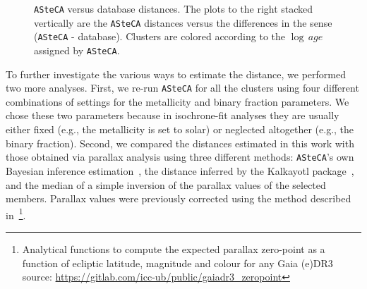 \documentclass[draft]{aa}
\begin{document}
  \begin{figure}
   \caption{\texttt{ASteCA} versus database distances. The plots to the right
   stacked vertically are the \texttt{ASteCA} distances versus the differences
   in the sense (\texttt{ASteCA} - database). Clusters are colored according to
   the $\log\,age$ assigned by \texttt{ASteCA}.}
   \label{fig:distances}
  \end{figure}

  To further investigate the various ways to estimate the distance, we performed
  two more analyses. First, we re-run \texttt{ASteCA} for all the
  clusters using four different combinations of settings for the metallicity and
  binary fraction parameters. We chose these two parameters because in
  isochrone-fit analyses they are usually either fixed (e.g., the metallicity is
  set to solar) or neglected altogether (e.g., the binary fraction).
  Second, we compared the distances estimated in this work with those obtained
  via parallax analysis using three different methods: \texttt{ASteCA}'s own
  Bayesian inference estimation~\citep[described in][]{Perren_2020}, the
  distance inferred by the Kalkayotl package~\citep{Kalkayotl}, and the median
  of a simple inversion of the parallax values of the selected members.
  Parallax values were previously corrected using the method described
  in~\cite{Lindegren_2021}\footnote{ Analytical functions to compute the
  expected parallax zero-point as a function of ecliptic latitude, magnitude and
  colour for any Gaia (e)DR3
  source: \url{https://gitlab.com/icc-ub/public/gaiadr3_zeropoint}}.
\end{document}
